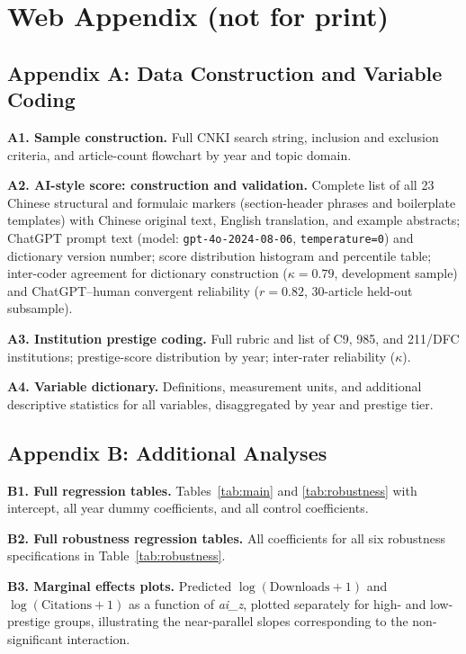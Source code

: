 \documentclass[12pt,a4paper]{article}
\begin{document}
\newpage
\section*{Web Appendix (not for print)}

\subsection*{Appendix A: Data Construction and Variable Coding}

\textbf{A1. Sample construction.}
Full CNKI search string, inclusion and exclusion criteria, and
article-count flowchart by year and topic domain.

\textbf{A2. AI-style score: construction and validation.}
Complete list of all 23 Chinese structural and formulaic markers
(section-header phrases and boilerplate templates) with Chinese
original text, English translation, and example abstracts;
ChatGPT prompt text (model: \texttt{gpt-4o-2024-08-06},
\texttt{temperature=0}) and dictionary version number;
score distribution histogram and percentile table;
inter-coder agreement for dictionary construction ($\kappa=0.79$,
development sample) and ChatGPT--human convergent reliability
($r=0.82$, 30-article held-out subsample).

\textbf{A3. Institution prestige coding.}
Full rubric and list of C9, 985, and 211/DFC institutions;
prestige-score distribution by year; inter-rater reliability ($\kappa$).

\textbf{A4. Variable dictionary.}
Definitions, measurement units, and additional descriptive statistics
for all variables, disaggregated by year and prestige tier.

\subsection*{Appendix B: Additional Analyses}

\textbf{B1. Full regression tables.}
Tables~\ref{tab:main} and \ref{tab:robustness} with intercept,
all year dummy coefficients, and all control coefficients.

\textbf{B2. Full robustness regression tables.}
All coefficients for all six robustness specifications in
Table~\ref{tab:robustness}.

\textbf{B3. Marginal effects plots.}
Predicted $\log(\text{Downloads}+1)$ and $\log(\text{Citations}+1)$
as a function of \textit{ai\_z}, plotted separately for high- and
low-prestige groups, illustrating the near-parallel slopes corresponding
to the non-significant interaction.
\end{document}
